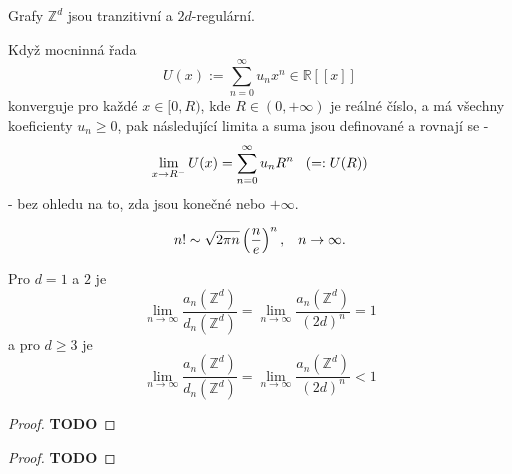 \documentclass[../main.tex]{subfiles}
\begin{document}
\begin{lemma}
    Grafy $\mathbb{Z}^d$ jsou tranzitivní a $2d$-regulární.
\end{lemma}

\begin{theorem}
    Když mocninná řada
    \[ U(x) := \sum_{n=0}^{\infty} u_nx^n \in \mathbb{R}[[x]] \]
    konverguje pro každé $x \in [0,R)$, kde $R \in (0, +\infty)$
    je reálné číslo, a má všechny koeficienty $u_n \geq 0$,
    pak následující limita a suma jsou definované a rovnají se -
    \[ \lim_{x\to R^-} U(x) = \sum_{n=0}^{\infty} u_nR^n \hspace{3mm} (=: U(R)) \]
    - bez ohledu na to, zda jsou konečné nebo $+\infty$.
\end{theorem}

\begin{theorem}
    \[ n! \sim \sqrt{2\pi n} \left( \frac{n}{e} \right)^n, \hspace{3mm} n\to \infty. \]
\end{theorem}

\begin{theorem}[Pólya]
    Pro $d = 1$ a $2$ je \[ \lim_{n\to\infty}\frac{a_n(\mathbb{Z}^d)}{d_n(\mathbb{Z}^d)} = \lim_{n\to\infty}\frac{a_n(\mathbb{Z}^d)}{(2d)^n} = 1 \]
    a pro $d \geq 3$ je
    \[ \lim_{n\to\infty} \frac{a_n(\mathbb{Z}^d)}{d_n(\mathbb{Z}^d)} = \lim_{n\to\infty}\frac{a_n(\mathbb{Z}^d)}{(2d)^n} < 1 \]
\end{theorem}
\begin{proof}
    \LARGE
    \textbf{TODO}
\end{proof}

\begin{proof}
    \LARGE
    \textbf{TODO}
\end{proof}
\end{document}

